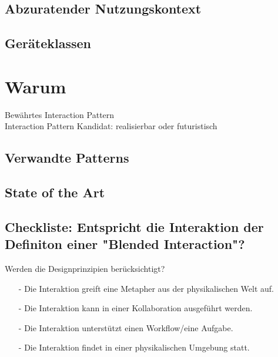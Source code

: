 \subsection*{Abzuratender Nutzungskontext}
\notvalidcontext

\subsection*{Geräteklassen}
\devicetabular



\section*{Warum}
\checkbox{\established} Bewährtes Interaction Pattern \\
\checkbox{\candidate} Interaction Pattern Kandidat: 
\checkbox{\realizable} realisierbar oder
\checkbox{\futuristic} futuristisch

\subsection*{Verwandte Patterns}
\otherpatterns

\subsection*{State of the Art}
\stateoftheart

\subsection*{Checkliste: Entspricht die Interaktion der Definiton einer "Blended Interaction"?}
\checkbox{\designprinciples} Werden die Designprinzipien berücksichtigt?
\begin{itemize}
\item[-] Die Interaktion greift eine Metapher aus der physikalischen Welt auf.
\item[-] Die Interaktion kann in einer Kollaboration ausgeführt werden.
\item[-] Die Interaktion unterstützt einen Workflow/eine Aufgabe.
\item[-] Die Interaktion findet in einer physikalischen Umgebung statt.
\end{itemize} 

